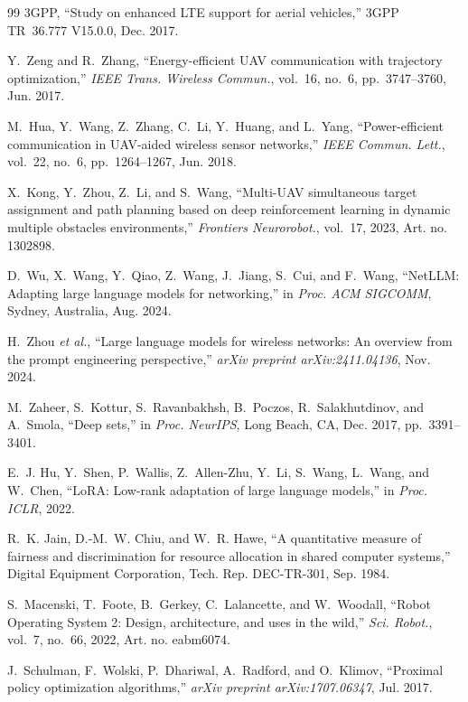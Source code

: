 \documentclass[journal]{IEEEtran}
\begin{document}
\begin{thebibliography}{99}
3GPP, ``Study on enhanced LTE support for aerial vehicles,'' 3GPP TR~36.777 V15.0.0, Dec. 2017.

Y.~Zeng and R.~Zhang, ``Energy-efficient UAV communication with trajectory optimization,'' \textit{IEEE Trans. Wireless Commun.}, vol.~16, no.~6, pp.~3747--3760, Jun. 2017.

M.~Hua, Y.~Wang, Z.~Zhang, C.~Li, Y.~Huang, and L.~Yang, ``Power-efficient communication in UAV-aided wireless sensor networks,'' \textit{IEEE Commun. Lett.}, vol.~22, no.~6, pp.~1264--1267, Jun. 2018.

X.~Kong, Y.~Zhou, Z.~Li, and S.~Wang, ``Multi-UAV simultaneous target assignment and path planning based on deep reinforcement learning in dynamic multiple obstacles environments,'' \textit{Frontiers Neurorobot.}, vol.~17, 2023, Art. no. 1302898.

D.~Wu, X.~Wang, Y.~Qiao, Z.~Wang, J.~Jiang, S.~Cui, and F.~Wang, ``NetLLM: Adapting large language models for networking,'' in \textit{Proc. ACM SIGCOMM}, Sydney, Australia, Aug. 2024.

H.~Zhou \textit{et al.}, ``Large language models for wireless networks: An overview from the prompt engineering perspective,'' \textit{arXiv preprint arXiv:2411.04136}, Nov. 2024.

M.~Zaheer, S.~Kottur, S.~Ravanbakhsh, B.~Poczos, R.~Salakhutdinov, and A.~Smola, ``Deep sets,'' in \textit{Proc. NeurIPS}, Long Beach, CA, Dec. 2017, pp.~3391--3401.

E.~J. Hu, Y.~Shen, P.~Wallis, Z.~Allen-Zhu, Y.~Li, S.~Wang, L.~Wang, and W.~Chen, ``LoRA: Low-rank adaptation of large language models,'' in \textit{Proc. ICLR}, 2022.

R.~K. Jain, D.-M.~W. Chiu, and W.~R. Hawe, ``A quantitative measure of fairness and discrimination for resource allocation in shared computer systems,'' Digital Equipment Corporation, Tech. Rep. DEC-TR-301, Sep. 1984.

S.~Macenski, T.~Foote, B.~Gerkey, C.~Lalancette, and W.~Woodall, ``Robot Operating System 2: Design, architecture, and uses in the wild,'' \textit{Sci. Robot.}, vol.~7, no.~66, 2022, Art. no. eabm6074.

J.~Schulman, F.~Wolski, P.~Dhariwal, A.~Radford, and O.~Klimov, ``Proximal policy optimization algorithms,'' \textit{arXiv preprint arXiv:1707.06347}, Jul. 2017.


\end{thebibliography}
\end{document}
